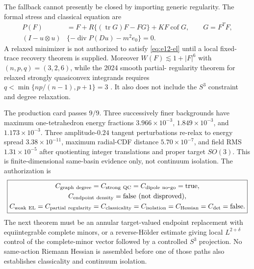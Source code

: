 The fallback cannot presently be closed by importing generic regularity.
The formal stress and classical equation are
\begin{align}
 P(F)&=F+R\{(\operatorname{tr}G)F-FG\}+KF\operatorname{cof}G,
 \qquad G=F^TF,\label{eq:e12-stress}\\
 (I-u\otimes u)&\{-\operatorname{div}P(Du)-m^2e_0\}=0.
 \label{eq:e12-el}
\end{align}
A relaxed minimizer is not authorized to satisfy \eqref{eq:e12-el} until a
local fixed-trace recovery theorem is supplied.  Moreover
$W(F)\lesssim1+|F|^6$ with $(n,p,q)=(3,2,6)$, while the 2024 smooth partial-
regularity theorem for relaxed strongly quasiconvex integrands requires
$q<\min\{np/(n-1),p+1\}=3$ \cite{GmeinederKristensen2024}.  It also does not
include the $S^3$ constraint and degree relaxation.

The production card passes $9/9$.  Three successively finer backgrounds have
maximum one-tetrahedron energy fractions
$3.966\times10^{-3}$, $1.849\times10^{-3}$, and
$1.173\times10^{-3}$.  Three amplitude-$0.24$ tangent perturbations re-relax
to energy spread $3.38\times10^{-11}$, maximum radial-CDF distance
$5.70\times10^{-7}$, and field RMS $1.31\times10^{-5}$ after quotienting
integer translations and proper target $SO(3)$.  This is finite-dimensional
same-basin evidence only, not continuum isolation.  The authorization is
\begin{equation}
 \boxed{\begin{gathered}
 C_{\rm graph\ degree}=C_{\rm strong\ QC}=C_{\rm dipole\ no\mbox{-}go}
 =\mathrm{true},\\
 C_{\rm endpoint\ density}=\mathrm{false\ (not\ disproved)},\\
 C_{\rm weak\ EL}=C_{\rm partial\ regularity}=C_{\rm classicality}
 =C_{\rm isolation}=C_{\rm Hessian}=C_{\det}=\mathrm{false}.
 \end{gathered}}
 \label{eq:e12-decision}
\end{equation}
The next theorem must be an annular target-valued endpoint replacement with
equiintegrable complete minors, or a reverse-H\"older estimate giving local
$L^{2+\delta}$ control of the complete-minor vector followed by a controlled
$S^3$ projection.  No same-action Riemann Hessian is assembled before one of
those paths also establishes classicality and continuum isolation.

